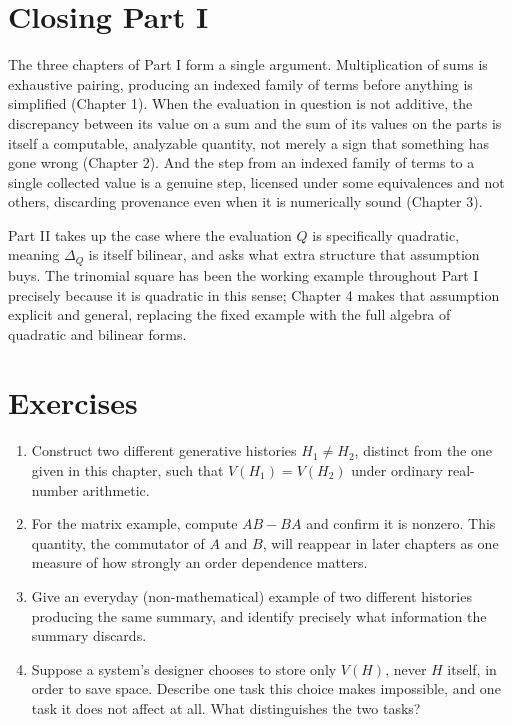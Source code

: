 \documentclass[11pt]{book}
\begin{document}
\section{Closing Part I}

The three chapters of Part I form a single argument. Multiplication of sums is exhaustive pairing, producing an indexed family of terms before anything is simplified (Chapter 1). When the evaluation in question is not additive, the discrepancy between its value on a sum and the sum of its values on the parts is itself a computable, analyzable quantity, not merely a sign that something has gone wrong (Chapter 2). And the step from an indexed family of terms to a single collected value is a genuine step, licensed under some equivalences and not others, discarding provenance even when it is numerically sound (Chapter 3).

Part II takes up the case where the evaluation $Q$ is specifically quadratic, meaning $\Delta_Q$ is itself bilinear, and asks what extra structure that assumption buys. The trinomial square has been the working example throughout Part I precisely because it is quadratic in this sense; Chapter 4 makes that assumption explicit and general, replacing the fixed example with the full algebra of quadratic and bilinear forms.

\section*{Exercises}
\begin{enumerate}
\item Construct two different generative histories $H_1 \ne H_2$, distinct from the one given in this chapter, such that $V(H_1)=V(H_2)$ under ordinary real-number arithmetic.
\item For the matrix example, compute $AB - BA$ and confirm it is nonzero. This quantity, the commutator of $A$ and $B$, will reappear in later chapters as one measure of how strongly an order dependence matters.
\item Give an everyday (non-mathematical) example of two different histories producing the same summary, and identify precisely what information the summary discards.
\item Suppose a system's designer chooses to store only $V(H)$, never $H$ itself, in order to save space. Describe one task this choice makes impossible, and one task it does not affect at all. What distinguishes the two tasks?
\end{enumerate}
\end{document}

